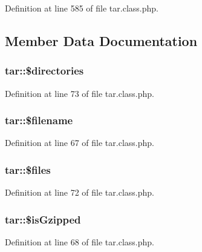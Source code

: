 Definition at line 585 of file tar.\+class.\+php.



\subsection{Member Data Documentation}
\hypertarget{classtar_a03d6b15a492e4917989d2577372dcb58}{}
\subsubsection[{\$directories}]{\setlength{\rightskip}{0pt plus 5cm}tar\+::\$directories}\label{classtar_a03d6b15a492e4917989d2577372dcb58}


Definition at line 73 of file tar.\+class.\+php.

\hypertarget{classtar_af99384023359a00770ca0ffb858b21fb}{}
\subsubsection[{\$filename}]{\setlength{\rightskip}{0pt plus 5cm}tar\+::\$filename}\label{classtar_af99384023359a00770ca0ffb858b21fb}


Definition at line 67 of file tar.\+class.\+php.

\hypertarget{classtar_a2082ab6894219b27e42024e925c4e11f}{}
\subsubsection[{\$files}]{\setlength{\rightskip}{0pt plus 5cm}tar\+::\$files}\label{classtar_a2082ab6894219b27e42024e925c4e11f}


Definition at line 72 of file tar.\+class.\+php.

\hypertarget{classtar_a82771381c948bca4c166212276fe4b46}{}
\subsubsection[{\$is\+Gzipped}]{\setlength{\rightskip}{0pt plus 5cm}tar\+::\$is\+Gzipped}\label{classtar_a82771381c948bca4c166212276fe4b46}


Definition at line 68 of file tar.\+class.\+php.

